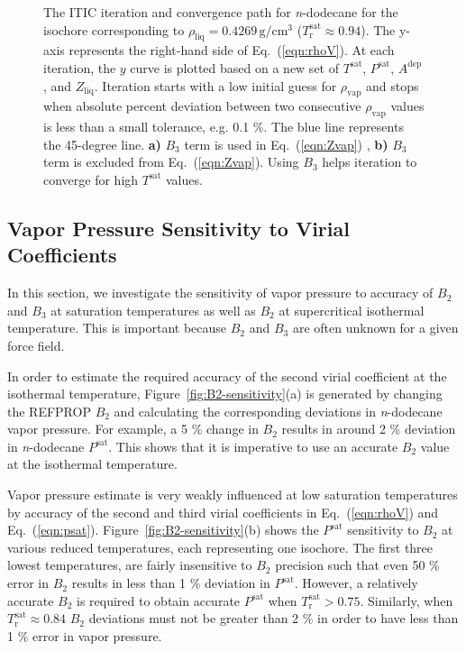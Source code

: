 \documentclass[5p,times]{elsarticle}
\begin{document}
\begin{figure}
\caption{
The ITIC iteration and convergence path for \textit{n}-dodecane for the isochore corresponding to $\rho_{\mathrm{liq}}=0.4269\,\mathrm{g/cm^3}$ ($T_\mathrm{r}^\mathrm{sat} \approx 0.94$). The y-axis represents the right-hand side of Eq.~(\ref{eqn:rhoV}). At each iteration, the $y$ curve is plotted based on a new set of $T^{\mathrm{sat}}$, $P^{\mathrm{sat}}$, $A^\mathrm{dep}$, and $Z_{\mathrm{liq}}$. Iteration starts with a low initial guess for $\rho_{\mathrm{vap}}$ and stops when absolute percent deviation between two consecutive $\rho_{\mathrm{vap}}$ values is less than a small tolerance, e.g. 0.1 \%.
The blue line represents the 45-degree line. \textbf{a)} $B_3$ term is used in Eq.~(\ref{eqn:Zvap})
, \textbf{b)} $B_3$ term is excluded from Eq.~(\ref{eqn:Zvap}). Using $B_3$ helps iteration to converge for high $T^{\mathrm{sat}}$ values.}
\label{fig:convergence-path}
\end{figure}

\subsection{Vapor Pressure Sensitivity to Virial Coefficients} \label{sec:Bx-Sensitivity}
In this section, we investigate the sensitivity of vapor pressure to accuracy of $B_2$ and $B_3$ at saturation temperatures as well as $B_2$ at supercritical isothermal temperature. This is important because $B_2$ and $B_3$ are often unknown for a given force field. 

In order to estimate the required accuracy of the second virial coefficient at the isothermal temperature, Figure~\ref{fig:B2-sensitivity}(a) is generated by changing the REFPROP $B_2$ and calculating the corresponding deviations in \textit{n}-dodecane vapor pressure. For example, a 5 \% change in $B_2$ results in around 2 \% deviation in \textit{n}-dodecane $P^{\mathrm{sat}}$. This shows that it is imperative to use an accurate $B_2$ value at the isothermal temperature.

Vapor pressure estimate is very weakly influenced at low saturation temperatures by accuracy of the second and third virial coefficients in Eq.~(\ref{eqn:rhoV}) and Eq.~(\ref{eqn:psat}). Figure~\ref{fig:B2-sensitivity}(b) shows the $P^{\mathrm{sat}}$ sensitivity to $B_2$ at various reduced temperatures, each representing one isochore. The first three lowest temperatures, are fairly insensitive to $B_2$ precision such that even 50 \% error in $B_2$ results in less than 1 \% deviation in $P^{\mathrm{sat}}$. However, a relatively accurate $B_2$ is required to obtain accurate $P^{\mathrm{sat}}$ when $T_\mathrm{r}^\mathrm{sat}>0.75$. Similarly, when $T_\mathrm{r}^\mathrm{sat} \approx 0.84$ $B_2$ deviations must not be greater than 2 \% in order to have less than 1 \% error in vapor pressure.
\end{document}
